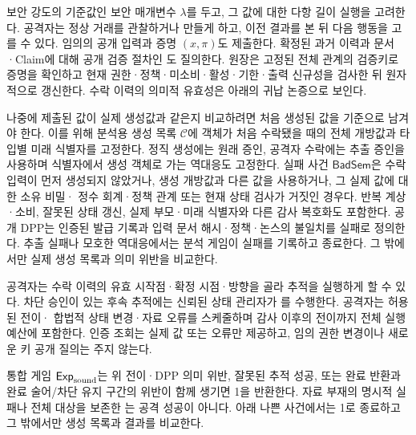 보안 강도의 기준값인 보안 매개변수 $\lambda$를 두고,
그 값에 대한 다항 길이 실행을 고려한다.
공격자는 정상 거래를 관찰하거나 만들게 하고,
이전 결과를 본 뒤 다음 행동을 고를 수 있다.
임의의 공개 입력과 증명 $(x,\pi)$도 제출한다.
확정된 과거 이력과 문서·Claim에 대해 공개 검증 절차인
도 질의한다. 원장은 고정된 전체 관계의 검증키로 증명을 확인하고 현재
권한·정책·미소비·활성·기한·출력 신규성을 검사한 뒤 원자적으로
갱신한다. 수락 이력의 의미적 유효성은 아래의 귀납 논증으로 보인다.

나중에 제출된 값이 실제 생성값과 같은지 비교하려면
처음 생성된 값을 기준으로 남겨야 한다.
이를 위해 분석용 생성 목록 $\mathcal C$에 객체가 처음 수락됐을
때의 전체 개방값과 타입별 미래 식별자를 고정한다. 정직 생성에는 원래 증인,
공격자 수락에는 추출 증인을 사용하며 식별자에서 생성 객체로 가는
역대응도 고정한다.
실패 사건 $\mathsf{BadSem}$은 수락 입력이 먼저 생성되지 않았거나,
생성 개방값과 다른 값을 사용하거나, 그 실제 값에 대한 소유 비밀·
정수 회계·정책 관계 또는 현재 상태 검사가 거짓인 경우다.
반복 계상·소비, 잘못된 상태 갱신, 실제 부모·미래 식별자와 다른
감사 복호화도 포함한다. 공개 DPP는 인증된 발급 기록과 입력
문서 해시·정책·논스의 불일치를 실패로 정의한다.
추출 실패나 모호한 역대응에서는 분석 게임이 실패를 기록하고
종료한다. 그 밖에서만 실제 생성 목록과 의미 위반을 비교한다.

공격자는 수락 이력의 유효 시작점·확정 시점·방향을 골라 추적을
실행하게 할 수 있다. 차단 승인이 있는 후속 추적에는 신뢰된 상태
관리자가 를 수행한다. 공격자는 허용된 전이·
합법적 상태 변경·자료 오류를 스케줄하며 감사 이후의 전이까지
전체 실행 예산에 포함한다. 인증 조회는 실제 값 또는 오류만
제공하고, 임의 권한 변경이나 새로운 키 공개 질의는 주지 않는다.

통합 게임 $\mathsf{Exp}_{\rm sound}$는 위 전이·DPP 의미 위반,
잘못된 추적 성공, 또는 완료 반환과 완료 술어/차단 유지 구간의
위반이 함께 생기면 1을 반환한다. 자료 부재의 명시적 실패나 전체
대상을 보존한 는 공격 성공이 아니다. 아래 나쁜
사건에서는 1로 종료하고 그 밖에서만 생성 목록과 결과를 비교한다.

